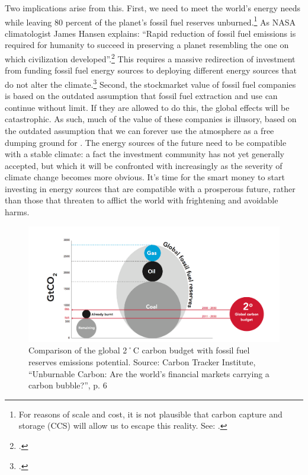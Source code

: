 Two implications arise from this. 
First, we need to meet the world's energy needs while leaving 80 percent of the planet's fossil fuel reserves unburned.\footnote{For reasons of scale and cost, it is not plausible that carbon capture and storage (CCS) will allow us to escape this reality. See: .} 
As NASA climatologist James Hansen explains: ``Rapid reduction of fossil fuel emissions is required for humanity to
succeed in preserving a planet resembling the one on which civilization developed''.\footcite[][]{HansenPaleo}
This requires a massive redirection of investment from funding fossil fuel energy sources to deploying different energy sources that do not alter the climate.\footcite[See: ][]{SternEuropeanLowCarbon}
Second, the stockmarket value of fossil fuel companies is based on the outdated assumption that fossil fuel extraction and use can continue without limit.
If they are allowed to do this, the global effects will be catastrophic.
As such, much of the value of these companies is illusory, based on the outdated assumption that we can forever use the atmosphere as a free dumping ground for .
The energy sources of the future need to be compatible with a stable climate: a fact the investment community has not yet generally accepted, but which it will be confronted with increasingly as the severity of climate change becomes more obvious.
It's time for the smart money to start investing in energy sources that are compatible with a prosperous future, rather than those that threaten to afflict the world with frightening and avoidable harms.



\begin{figure}
\includegraphics[width=\textwidth]{s1-carbon-budget.png}
\centering
\caption{Comparison of the global 2˚C carbon budget with fossil fuel reserves  emissions potential. Source: Carbon Tracker Institute, ``Unburnable Carbon: Are the world's financial markets carrying a carbon bubble?'', p. 6}
\label{fig:TwoDegreeBudget}
\end{figure}



